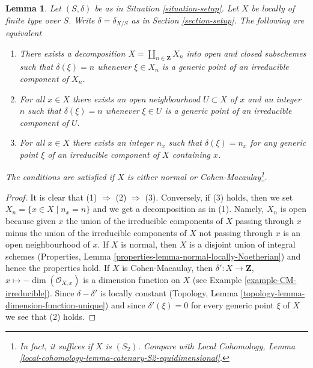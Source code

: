 \documentclass[10pt,a4paper]{amsart}
\theoremstyle{plain}
\newtheorem{lemma}[subsection]{Lemma}
\theoremstyle{definition}
\theoremstyle{remark}
\numberwithin{equation}{subsection}
\begin{document}
\begin{lemma}
\label{lemma-locally-equidimensional}
Let $(S, \delta)$ be as in Situation \ref{situation-setup}.
Let $X$ be locally of finite type over $S$. Write
$\delta = \delta_{X/S}$ as in Section \ref{section-setup}.
The following are equivalent
\begin{enumerate}
\item There exists a decomposition $X = \coprod_{n \in \mathbf{Z}} X_n$
into open and closed subschemes such that $\delta(\xi) = n$ whenever
$\xi \in X_n$ is a generic point of an irreducible component of $X_n$.
\item For all $x \in X$ there exists an open neighbourhood $U \subset X$
of $x$ and an integer $n$ such that $\delta(\xi) = n$ whenever
$\xi \in U$ is a generic point of an irreducible component of $U$.
\item For all $x \in X$ there exists an integer $n_x$ such that
$\delta(\xi) = n_x$ for any generic point $\xi$ of an irreducible
component of $X$ containing $x$.
\end{enumerate}
The conditions are satisfied if $X$ is either
normal or Cohen-Macaulay\footnote{In fact, it suffices if
$X$ is $(S_2)$. Compare with Local Cohomology, Lemma
\ref{local-cohomology-lemma-catenary-S2-equidimensional}.}.
\end{lemma}

\begin{proof}
It is clear that (1) $\Rightarrow$ (2) $\Rightarrow$ (3).
Conversely, if (3) holds, then we set $X_n = \{x \in X \mid n_x = n\}$
and we get a decomposition as in (1). Namely, $X_n$ is open because
given $x$ the union of the irreducible components of $X$ passing through $x$
minus the union of the irreducible components of $X$ not passing through $x$
is an open neighbourhood of $x$. If $X$ is normal, then $X$ is a
disjoint union of integral schemes
(Properties, Lemma \ref{properties-lemma-normal-locally-Noetherian})
and hence the properties hold.
If $X$ is Cohen-Macaulay, then
$\delta' : X \to \mathbf{Z}$, $x \mapsto -\dim(\mathcal{O}_{X, x})$
is a dimension function on $X$ (see Example \ref{example-CM-irreducible}).
Since $\delta - \delta'$ is locally constant
(Topology, Lemma \ref{topology-lemma-dimension-function-unique})
and since $\delta'(\xi) = 0$ for every generic point $\xi$ of $X$
we see that (2) holds.
\end{proof}
\end{document}
